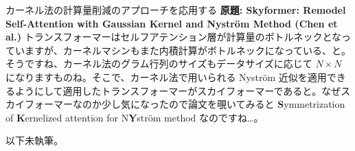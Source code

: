 \documentclass[b5paper,xelatex,ja=standard,10pt]{bxjsarticle}
\begin{document}
\vspace{5pt}
\begin{PROP}[colback=White]{カーネル法の計算量削減のアプローチを応用する \cite{03_Chen2021}}
\textbf{原題: Skyformer: Remodel Self-Attention with Gaussian Kernel and Nystr\"om Method (Chen et al.)} 
\tcblower
トランスフォーマーはセルフアテンション層が計算量のボトルネックとなっていますが、カーネルマシンもまた内積計算がボトルネックになっている、と。そうですね、カーネル法のグラム行列のサイズもデータサイズに応じて $N \times N$ になりますものね。そこで、カーネル法で用いられる Nyström 近似を適用できるようにして適用したトランスフォーマーがスカイフォーマーであると。なぜスカイフォーマーなのか少し気になったので論文を覗いてみると \textbf{S}ymmetrization of \textbf{K}ernelized attention for N\textbf{Y}ström method なのですね…。
\end{PROP}

以下未執筆。
\end{document}
